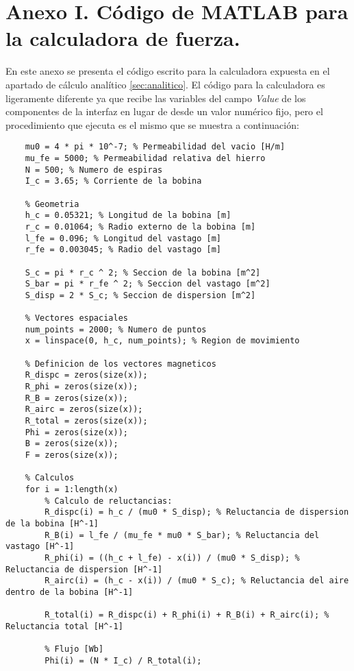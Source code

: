 \section*{Anexo I. Código de MATLAB para la calculadora de fuerza.}
\label{sec:anexo1}
En este anexo se presenta el código escrito para la calculadora expuesta en el apartado de cálculo analítico \ref{sec:analitico}. El código para la calculadora es ligeramente diferente ya que recibe las variables del campo \textit{Value} de los componentes de la interfaz en lugar de desde un valor numérico fijo, pero el procedimiento que ejecuta es el mismo que se muestra a continuación:

\begin{lstlisting}[style=Matlab-editor]
    % Propiedades electromagneticas
    mu0 = 4 * pi * 10^-7; % Permeabilidad del vacio [H/m]
    mu_fe = 5000; % Permeabilidad relativa del hierro
    N = 500; % Numero de espiras
    I_c = 3.65; % Corriente de la bobina

    % Geometria
    h_c = 0.05321; % Longitud de la bobina [m]
    r_c = 0.01064; % Radio externo de la bobina [m]
    l_fe = 0.096; % Longitud del vastago [m]
    r_fe = 0.003045; % Radio del vastago [m]

    S_c = pi * r_c ^ 2; % Seccion de la bobina [m^2]
    S_bar = pi * r_fe ^ 2; % Seccion del vastago [m^2]
    S_disp = 2 * S_c; % Seccion de dispersion [m^2]

    % Vectores espaciales
    num_points = 2000; % Numero de puntos
    x = linspace(0, h_c, num_points); % Region de movimiento

    % Definicion de los vectores magneticos
    R_dispc = zeros(size(x));
    R_phi = zeros(size(x));
    R_B = zeros(size(x));
    R_airc = zeros(size(x));
    R_total = zeros(size(x));
    Phi = zeros(size(x));
    B = zeros(size(x));
    F = zeros(size(x));

    % Calculos
    for i = 1:length(x)
        % Calculo de reluctancias:
        R_dispc(i) = h_c / (mu0 * S_disp); % Reluctancia de dispersion de la bobina [H^-1]
        R_B(i) = l_fe / (mu_fe * mu0 * S_bar); % Reluctancia del vastago [H^-1]
        R_phi(i) = ((h_c + l_fe) - x(i)) / (mu0 * S_disp); % Reluctancia de dispersion [H^-1]
        R_airc(i) = (h_c - x(i)) / (mu0 * S_c); % Reluctancia del aire dentro de la bobina [H^-1]

        R_total(i) = R_dispc(i) + R_phi(i) + R_B(i) + R_airc(i); % Reluctancia total [H^-1]
        
        % Flujo [Wb]
        Phi(i) = (N * I_c) / R_total(i);
        

\end{lstlisting}
